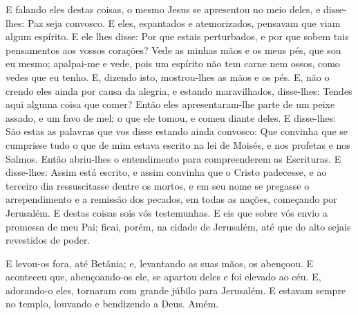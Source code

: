 E falando eles destas coisas, o mesmo Jesus se apresentou no meio
deles, e disse-lhes: Paz seja convosco. E eles, espantados e
atemorizados, pensavam que viam algum espírito. E ele lhes
disse: Por que estais perturbados, e por que sobem tais pensamentos
aos vossos corações? Vede as minhas mãos e os meus pés, que
sou eu mesmo; apalpai-me e vede, pois um espírito não tem carne nem
ossos, como vedes que eu tenho. E, dizendo isto, mostrou-lhes
as mãos e os pés. E, não o crendo eles ainda por causa da
alegria, e estando maravilhados, disse-lhes: Tendes aqui alguma
coisa que comer? Então eles apresentaram-lhe parte de um
peixe assado, e um favo de mel; o que ele tomou, e comeu
diante deles. E disse-lhes: São estas as palavras que vos
disse estando ainda convosco: Que convinha que se cumprisse tudo o
que de mim estava escrito na lei de Moisés, e nos profetas e nos
Salmos. Então abriu-lhes o entendimento para compreenderem as
Escrituras. E disse-lhes: Assim está escrito, e assim
convinha que o Cristo padecesse, e ao terceiro dia ressuscitasse
dentre os mortos, e em seu nome se pregasse o arrependimento
e a remissão dos pecados, em todas as nações, começando por
Jerusalém. E destas coisas sois vós testemunhas. E eis
que sobre vós envio a promessa de meu Pai; ficai, porém, na cidade
de Jerusalém, até que do alto sejais revestidos de poder.

E levou-os fora, até Betânia; e, levantando as suas mãos, os
abençoou. E aconteceu que, abençoando-os ele, se apartou
deles e foi elevado ao céu. E, adorando-o eles, tornaram com
grande júbilo para Jerusalém. E estavam sempre no templo,
louvando e bendizendo a Deus. Amém.

